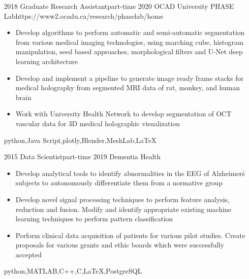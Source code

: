 \begin{experiences}
	\myExperience
	{2018}       {Graduate Research Assistant}{part-time}
	{2020}      {OCAD University PHASE Lab}{https://www2.ocadu.ca/research/phaselab/home}
	{
		\begin{itemize}
			\item Develop algorithms to perform automatic and semi-automatic segmentation from various medical imaging technologies, using marching cube, histogram manipulation, seed based approaches, morphological filters and U-Net deep learning architecture
			\item Develop and implement a pipeline to generate image ready frame stacks for medical holography from segmented MRI data of rat, monkey, and human brain
			\item Work with University Health Network to develop segmentation of OCT vascular data for 3D medical holographic visualization
		\end{itemize}
	}
	{python,Java Script,plotly,Blender,MeshLab,\LaTeX}
	
	\emptySeparator	
	
	\myExperience
	{2015}       {Data Scientist}{part-time}
	{2019}      {Dementia Health}{}
	{
		\begin{itemize}
			\item Develop analytical tools to identify abnormalities in the EEG of Alzheimer\'s subjects to autonomously differentiate them from a normative group
			\item  Develop novel signal processing techniques to perform feature analysis, reduction and fusion. Modify and identify appropriate existing machine learning techniques to perform pattern classification
			\item Perform clinical data acquisition of patients for various pilot studies. Create proposals for various grants and ethic boards which were successfully accepted
		\end{itemize}
	}
	{python,MATLAB,C++,C,\LaTeX,PostgreSQL}
	
	\emptySeparator
	

\end{experiences}
